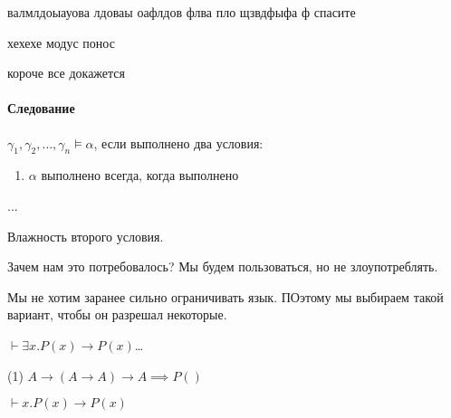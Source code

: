 валмлдоыауова лдоваы оафлдов флва пло щзвдфыфа ф
спасите 

хехехе модус понос

короче все докажется

\paragraph{Следование}

\begin{definition}[Следование]
    $\gamma_1, \gamma_2, \dots, \gamma_n \vDash \alpha$, если выполнено два условия:
    \begin{enumerate}
        \item $\alpha$ выполнено всегда, когда выполнено
    \end{enumerate}
    ...
\end{definition}

Влажность второго условия. 


Зачем нам это потребовалось?  Мы будем пользоваться, но не злоупотреблять.


Мы не хотим заранее сильно ограничивать язык. ПОэтому мы выбираем такой вариант, чтобы он разрешал некоторые.


\begin{example}
    $\vdash \exists x. P(x) \to P(x)$\ldots

    (1) $A \to (A \to A) \to A \implies P()$
\end{example}

\begin{example}
    $\vdash x. P(x) \to P(x)$
\end{example}

